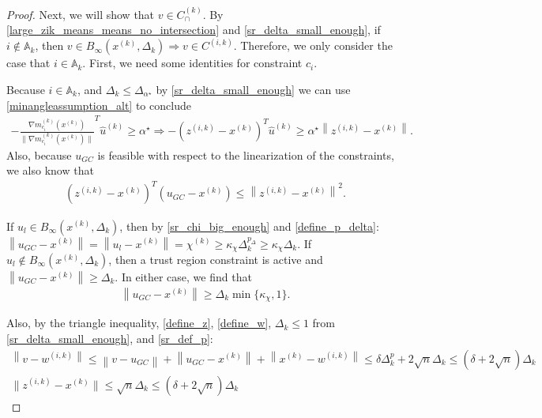 \documentclass{article}
\theoremstyle{case}
\numberwithin{theorem}{subsection}
\newcommand{\activeconstraintsk}{{\mathbb A_{k}}}
\newcommand{\capcones}{{C^{(k)}_{\cap}}}
\newcommand{\chik}{{\chi^{(k)}}}
\newcommand{\dk}{\Delta_k}
\newcommand{\gmcik}{{\nabla m_{c_i}^{(k)}\left(\xk\right)}}
\newcommand{\huk}{{{\hat u}^{(k)}}}
\newcommand{\minanglealpha}{{ \alpha^{\star} }}
\newcommand{\minangledelta}{{\Delta_{\alpha^{\star}}}}
\newcommand{\tr}{{ B_{\infty}\left(\xk, \dk\right) }}
\newcommand{\wik}{{w^{(i, k)}}}
\newcommand{\xk}{x^{(k)}}
\newcommand{\zik}{{z^{(i, k)}}}
\newcommand{\fik}{{C^{(i, k)}}}
\begin{document}
\begin{proof}
Next, we will show that $v \in \capcones$.
\color{red}
By \cref{large_zik_means_means_no_intersection} and \cref{sr_delta_small_enough}, if $i \not \in \activeconstraintsk$, then $v \in \tr \Longrightarrow v \in \fik$.
Therefore, we only consider the case that $i \in \activeconstraintsk$.
\color{black}
First, we need some identities for constraint $c_i$.

Because $i \in \activeconstraintsk$, and $\dk\le\minangledelta$ by \cref{sr_delta_small_enough} we can use \cref{minangleassumption_alt} to conclude
\begin{align}
-\frac {\gmcik}{\|\gmcik\|} ^T\huk \ge \minanglealpha \Longrightarrow -\left(\zik - \xk\right)^T\huk \ge \minanglealpha \left\|\zik - \xk\right\|. \label{u_is_feasible}
\end{align}
Also, because $u_{GC}$ is feasible with respect to the linearization of the constraints, we also know that
\begin{align}
\left(\zik - \xk\right)^T(u_{GC} - \xk) \le \left\|\zik - \xk\right\|^2. \label{gc_is_feasible}
\end{align}

If $u_l \in \tr$, then by \cref{sr_chi_big_enough} and \cref{define_p_delta}: $\left\|u_{GC} - \xk\right\|  = \left\|u_{l} - \xk\right\| = \chik \ge \kappa_{\chi} \dk^{p_{\Delta}} \ge  \kappa_{\chi} \dk$.
If $u_l \not \in \tr$, then a trust region constraint is active and $\left\|u_{GC} - \xk\right\| \ge \dk$.
In either case, we find that 
\begin{align}
\left\|u_{GC} - \xk\right\| \ge \dk \min\{\kappa_{\chi}, 1 \} \label{gc_big_enough}.
\end{align}


Also, by the triangle inequality, \cref{define_z}, \cref{define_w}, $\dk \le 1$ from \cref{sr_delta_small_enough}, and \cref{sr_def_p}:
\begin{align}
\left\|v - \wik\right\| \le \left\|v - u_{GC}\right\| + \left\|u_{GC} - \xk \right\| + \left\|\xk - \wik\right\| \le \delta \dk^p + 2\sqrt{n}\dk \le \left(\delta + 2\sqrt{n}\right)\dk \label{sr_v_minus_w_small} \\
\|\zik - \xk \| \le \sqrt{n}\dk \le \left(\delta + 2\sqrt{n}\right)\dk \label{sr_z_minus_x_small}
\end{align}


\end{proof}
\end{document}
